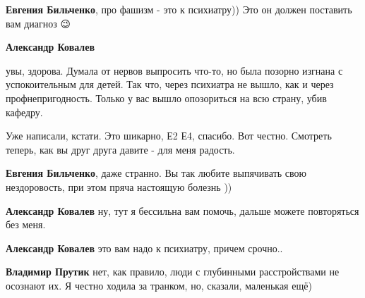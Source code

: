 \begin{itemize}
\begin{itemize}
\textbf{Евгения Бильченко}, про фашизм - это к психиатру))
Это он должен поставить вам диагноз 😉

 
\textbf{Александр Ковалев} 

увы, здорова. Думала от нервов выпросить что-то, но была позорно изгнана с
успокоительным для детей. Так что, через психиатра не вышло, как и через
профнепригодность. Только у вас вышло опозориться на всю страну, убив кафедру.

Уже написали, кстати. Это шикарно, Е2 Е4, спасибо. Вот честно. Смотреть теперь,
как вы друг друга давите - для меня радость.


 
\textbf{Евгения Бильченко}, даже странно. Вы так любите выпячивать свою нездоровость, при этом пряча настоящую болезнь ))

 
\textbf{Александр Ковалев} ну, тут я бессильна вам помочь, дальше можете повторяться без меня.

 
\textbf{Александр Ковалев} это вам надо к психиатру, причем срочно..

 
\textbf{Владимир Прутик} нет, как правило, люди с глубинными расстройствами не осознают их. Я честно ходила за транком, но, сказали, маленькая ещё)


\end{itemize}
\end{itemize}

